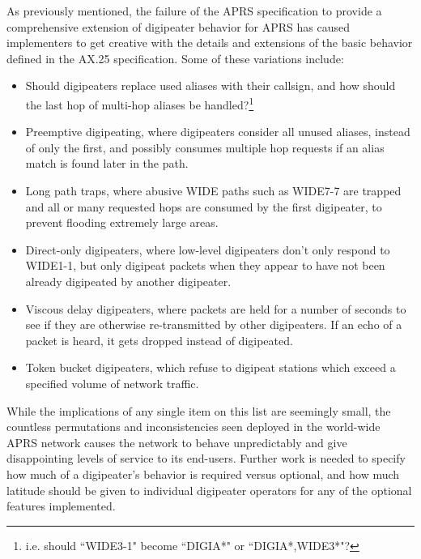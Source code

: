 As previously mentioned, the failure of the APRS specification to provide
a comprehensive extension of digipeater behavior for APRS has caused
implementers to get creative with the details and extensions of
the basic behavior defined in the AX.25 specification.
Some of these variations include:
\begin{itemize}
	\item Should digipeaters replace used aliases with their callsign, and
		how should the last hop of multi-hop aliases be handled?\footnote{i.e.
		should ``WIDE3-1" become ``DIGIA*" or ``DIGIA*,WIDE3*"?}
	\item Preemptive digipeating, where digipeaters consider all
		unused aliases, instead of only the first,
		and possibly consumes multiple hop requests if an alias match is
		found later in the path.
	\item Long path traps, where abusive WIDE paths such as WIDE7-7 are trapped
		and all or many requested hops are consumed by the first digipeater,
		to prevent flooding extremely large areas.
	\item Direct-only digipeaters, where low-level digipeaters don't only respond
		to WIDE1-1, but only digipeat packets when they appear to have not
		been already digipeated by another digipeater.
	\item Viscous delay digipeaters, where packets are held for a number of
		seconds to see if they are otherwise re-transmitted by other digipeaters.
		If an echo of a packet is heard, it gets dropped instead of digipeated.
	\item Token bucket digipeaters, which refuse to digipeat stations which
		exceed a specified volume of network traffic.
\end{itemize}

While the implications of any single item on this list are seemingly small,
the countless permutations and inconsistencies seen deployed in the
world-wide APRS network causes the network to behave unpredictably and
give disappointing levels of service to its end-users.
Further work is needed to specify how much of a digipeater's behavior is
required versus optional, and how much latitude should be given to individual
digipeater operators for any of the optional features implemented.


